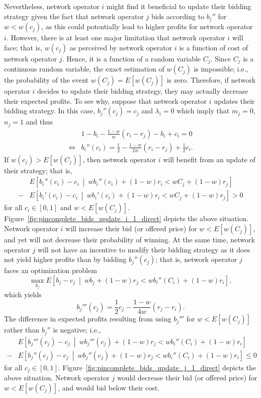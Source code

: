 Nevertheless, network operator $i$ might find it beneficial to update their bidding strategy given the fact that network operator $j$ bids according to $b_j''$ for $w<w(c_j)$, as this could potentially lead to higher profits for network operator $i$. However, there is at least one major limitation that network operator $i$ will face; that is, $w(c_j)$ as perceived by network operator $i$ is a function of cost of network operator $j$. Hence, it is a function of a random variable $C_j$. Since $C_j$ is a continuous random variable, the exact estimation of $w(C_j)$ is impossible; i.e., the probability of the event $w(C_j)=E[w(C_j)]$ is zero. Therefore, if network operator $i$ decides to update their bidding strategy, they may actually decrease their expected profits. To see why, suppose that network operator $i$ updates their bidding strategy. In this case, $b_j''(c_j) = c_j$ and $\lambda_i = 0$ which imply that $m_j = 0$, $n_j=1$ and thus
\begin{align*}
	&1 - b_i - \frac{1-w}{w}(r_i-r_j) - b_i + c_i = 0\\
	\iff &b_i''(c_i) = \frac{1}{2} - \frac{1-w}{2w}(r_i-r_j) + \frac{1}{2}c_i.
\end{align*}
If $w(c_j) > E[w(C_j)]$, then network operator $i$ will benefit from an update of their strategy; that is,
\begin{align*}
	&E\left[b_i''(c_i)-c_i \:\middle\vert\: wb_i''(c_i) + (1-w)r_i < wC_j + (1-w)r_j \right]\\
	- &E\left[b_i'(c_i)-c_i \:\middle\vert\: wb_i'(c_i) + (1-w)r_i < wC_j + (1-w)r_j \right] > 0
\end{align*}
for all $c_i\in[0,1]$ and $w < E[w(C_j)]$. Figure~\ref{fig:pincomplete_bids_update_i_1_direct} depicts the above situation. Network operator $i$ will increase their bid (or offered price) for $w < E[w(C_j)]$, and yet will not decrease their probability of winning. At the same time, network operator $j$ will not have an incentive to modify their bidding strategy as it does not yield higher profits than by bidding $b_j''(c_j)$; that is, network operator $j$ faces an optimization problem
\begin{equation*}
	\max_{b_j} E\left[b_j - c_j \:\middle\vert\: wb_j + (1-w)r_j < wb_i''(C_i) + (1-w)r_i \right],
\end{equation*}
which yields
\begin{equation*}
	b_j'''(c_j) = \frac{1}{2}c_j - \frac{1-w}{4w}(r_j-r_i).
\end{equation*}
The difference in expected profits resulting from using $b_j'''$ for $w < E[w(C_j)]$ rather than $b_j''$ is negative; i.e.,
\begin{align*}
	&E\left[b_j'''(c_j)-c_j \:\middle\vert\: wb_j'''(c_j) + (1-w)r_j < wb_i''(C_i) + (1-w)r_i \right]\\
	- &E\left[b_j''(c_j)-c_j \:\middle\vert\: wb_j''(c_j) + (1-w)r_j < wb_i''(C_i) + (1-w)r_i \right] \le 0
\end{align*}
for all $c_j\in[0,1]$. Figure~\ref{fig:pincomplete_bids_update_j_1_direct} depicts the above situation. Network operator $j$ would decrease their bid (or offered price) for $w < E[w(C_j)]$, and would bid below their cost.

